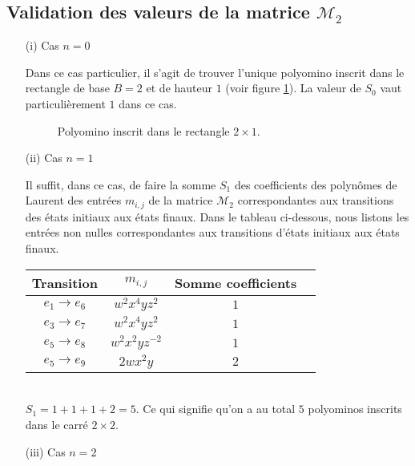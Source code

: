 \subsection{Validation des valeurs de la matrice $\mathcal{M}_{2}$}
\begin{itemize}
\item[(i)] Cas $n=0$

Dans ce cas particulier, il s'agit de trouver l'unique polyomino inscrit dans le rectangle de base $B=2$ et de hauteur $1$ (voir figure \ref{uni2}). La valeur de $S_{0}$ vaut particulièrement $1$ dans ce cas.
 \begin{figure}[!htb]
 \begin{minipage}[c]{.26\linewidth}
  \centering
  \end{minipage}
  \hfill
\begin{minipage}[c]{.56\linewidth}
  \centering
\begin{logicpuzzle}[rows=1,columns=2,color=cyan!100, width=750px,scale=0.5]
\framepuzzle[black!50]
\end{logicpuzzle}
\end{minipage}
\caption{\label{uni2} Polyomino inscrit dans le rectangle $2\times 1$.}
\end{figure}
\item[(ii)] Cas $n=1$

Il suffit, dans ce cas, de faire la somme $S_{1}$ des coefficients des polynômes de Laurent des entrées $m_{i,j}$ de la matrice $\mathcal{M}_{2}$  correspondantes aux transitions des états initiaux aux états finaux. Dans le tableau ci-dessous, nous listons les entrées  non nulles correspondantes aux transitions d'états initiaux aux états finaux.\\

\begin{tabular}{|c|c|c|c|}
 \hline
  Transition& $m_{i,j}$ & Somme  coefficients\\
 \hline
 $e_{1}\rightarrow e_{6}$ & $w^{2}x^{4}yz^{2}$ & $1$ \\
 \hline
 $e_{3}\rightarrow e_{7}$ & $w^{2}x^{4}yz^{2}$ & $1$ \\
 \hline
 $e_{5}\rightarrow e_{8}$ & $w^{2}x^{2}yz^{-2}$ & $1$ \\
 \hline
 $e_{5}\rightarrow e_{9}$ & $2wx^{2}y$ & $2$ \\
 \hline
\end{tabular}
\mbox{ }\\

$S_{1}=1+1+1+2=5$. Ce qui signifie qu'on a au total $5$ polyominos inscrits dans le carré $2\times 2$.
\item[(iii)] Cas $n=2$


\end{itemize}
